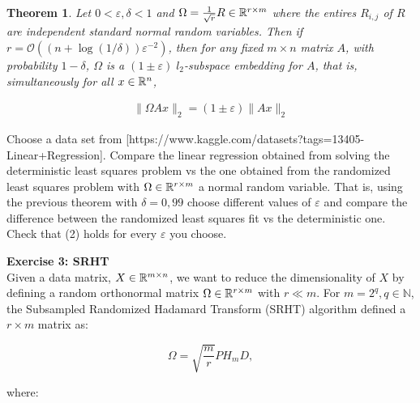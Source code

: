 \documentclass[11pt]{article}
\newcommand\bigO[1]{{\ensuremath{\mathcal{O}(#1)}}}
\newtheorem{theorem}{Theorem}
\begin{document}
\begin{theorem}
Let $0 < \varepsilon, \delta < 1$ and $\Omega = \frac{1}{\sqrt{r}} R \in \mathbb{R}^{r \times m}$ where the entires $R_{i,j}$ of $R$ are independent standard normal random variables. Then if $r = \bigO{(n + \log(1/\delta))\varepsilon^{-2}}$, then for any fixed $m \times n$ matrix $A$, with probability $1-\delta$, $\Omega$ is a $(1 \pm \varepsilon) \; l_2$-subspace embedding for $A$, that is, simultaneously for all $x \in \mathbb{R}^{n}$,

\begin{align}
\|\Omega A x\|_2 = (1 \pm \varepsilon)\|Ax\|_2
\end{align}

\end{theorem}

Choose a data set from \href{https://www.kaggle.com/datasets?tags=13405-Linear+Regression}[https://www.kaggle.com/datasets?tags=13405-Linear+Regression]. Compare the linear regression obtained from solving the deterministic least squares problem vs the one obtained from the randomized least squares problem with $\Omega \in \mathbb{R}^{r \times m}$ a normal random variable. That is, using the previous theorem with $\delta = 0,99$ choose different values of $\varepsilon$ and compare the difference between the randomized least squares fit vs the deterministic one. Check that (2) holds for every $\varepsilon$ you choose.


\bigskip

{\bf{Exercise 3: SRHT}}\\

Given a data matrix, $X \in \mathbb{R}^{m \times n}$, we want to reduce the dimensionality of $X$ by defining a random orthonormal matrix $\Omega \in \mathbb{R}^{r \times m}$ with $r \ll m$. For $m = 2^q, q \in \mathbb{N}$, the Subsampled Randomized Hadamard Transform (SRHT) algorithm defined a $r \times m$ matrix as:

\[ \Omega = \sqrt{\frac{m}{r}} PH_{m}D, \]

where:
\end{document}
